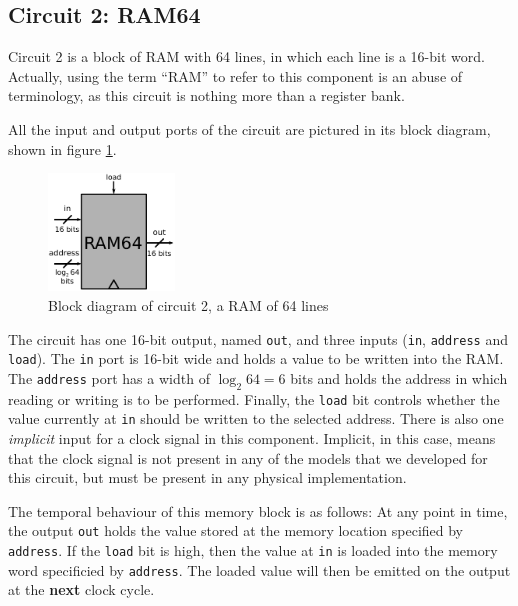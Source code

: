 \documentclass[a4paper]{article}
\begin{document}


        \subsection{Circuit 2: RAM64}
        \label{subsec:ram-circuit}
            Circuit 2 is a block of RAM with 64 lines, in which each line is a 16-bit word.
            Actually, using the term ``RAM'' to refer to this component is an abuse of terminology,
            as this circuit is nothing more than a register bank.

            All the input and output ports of the circuit are pictured in its block diagram, shown
            in figure \ref{fig:ram-block}.

            \begin{figure}[h!]
                \centerline{\includegraphics[width=0.3\textwidth]{imgs/ram-block.pdf}}
                \caption{Block diagram of circuit 2, a RAM of 64 lines
                    \label{fig:ram-block}}
            \end{figure}

            The circuit has one 16-bit output, named \texttt{out}, and three inputs (\texttt{in},
            \texttt{address} and \texttt{load}). The \texttt{in} port is 16-bit wide and holds a
            value to be written into the RAM. The \texttt{address} port has a width of $\log_{2} 64
            = 6$ bits and holds the address in which reading or writing is to be performed. Finally,
            the \texttt{load} bit controls whether the value currently at \texttt{in} should be
            written to the selected address. There is also one \emph{implicit} input for a clock
            signal in this component.  Implicit, in this case, means that the clock signal is not
            present in any of the models that we developed for this circuit, but must be present in
            any physical implementation.

            The temporal behaviour of this memory block is as follows: At any point in time, the
            output \texttt{out} holds the value stored at the memory location specified by
            \texttt{address}.  If the \texttt{load} bit is high, then the value at \texttt{in} is
            loaded into the memory word specificied by \texttt{address}. The loaded value will then
            be emitted on the output at the \textbf{next} clock cycle.
\end{document}
